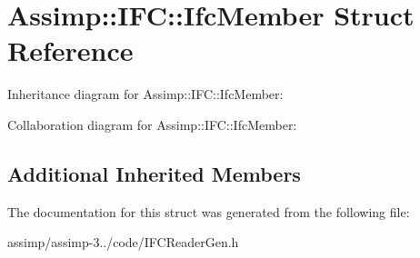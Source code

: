 \hypertarget{struct_assimp_1_1_i_f_c_1_1_ifc_member}{\section{Assimp\+:\+:I\+F\+C\+:\+:Ifc\+Member Struct Reference}
\label{struct_assimp_1_1_i_f_c_1_1_ifc_member}
}


Inheritance diagram for Assimp\+:\+:I\+F\+C\+:\+:Ifc\+Member\+:


Collaboration diagram for Assimp\+:\+:I\+F\+C\+:\+:Ifc\+Member\+:
\subsection*{Additional Inherited Members}


The documentation for this struct was generated from the following file\+:\begin{DoxyCompactItemize}
\item 
assimp/assimp-\/3../code/I\+F\+C\+Reader\+Gen.\+h\end{DoxyCompactItemize}
